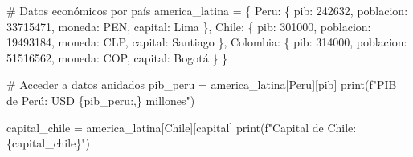 \documentclass[
  doc,
  floatsintext,
  longtable,
  a4paper,
  nolmodern,
  notxfonts,
  notimes,
  12pt,
  colorlinks=true,linkcolor=blue,citecolor=blue,urlcolor=blue]{apa7}
\newenvironment{Shaded}{\begin{snugshade}}{\end{snugshade}}
\newcommand{\BuiltInTok}[1]{\textcolor[rgb]{0.00,0.23,0.31}{#1}}
\newcommand{\CommentTok}[1]{\textcolor[rgb]{0.37,0.37,0.37}{#1}}
\newcommand{\DecValTok}[1]{\textcolor[rgb]{0.68,0.00,0.00}{#1}}
\newcommand{\NormalTok}[1]{\textcolor[rgb]{0.00,0.23,0.31}{#1}}
\newcommand{\OperatorTok}[1]{\textcolor[rgb]{0.37,0.37,0.37}{#1}}
\newcommand{\SpecialCharTok}[1]{\textcolor[rgb]{0.37,0.37,0.37}{#1}}
\newcommand{\SpecialStringTok}[1]{\textcolor[rgb]{0.13,0.47,0.30}{#1}}
\newcommand{\StringTok}[1]{\textcolor[rgb]{0.13,0.47,0.30}{#1}}
\begin{document}
\begin{Shaded}
\begin{Highlighting}[]
\CommentTok{\# Datos económicos por país}
\NormalTok{america\_latina }\OperatorTok{=}\NormalTok{ \{}
    \StringTok{\textquotesingle{}Peru\textquotesingle{}}\NormalTok{: \{}
        \StringTok{\textquotesingle{}pib\textquotesingle{}}\NormalTok{: }\DecValTok{242632}\NormalTok{,}
        \StringTok{\textquotesingle{}poblacion\textquotesingle{}}\NormalTok{: }\DecValTok{33715471}\NormalTok{,}
        \StringTok{\textquotesingle{}moneda\textquotesingle{}}\NormalTok{: }\StringTok{\textquotesingle{}PEN\textquotesingle{}}\NormalTok{,}
        \StringTok{\textquotesingle{}capital\textquotesingle{}}\NormalTok{: }\StringTok{\textquotesingle{}Lima\textquotesingle{}}
\NormalTok{    \},}
    \StringTok{\textquotesingle{}Chile\textquotesingle{}}\NormalTok{: \{}
        \StringTok{\textquotesingle{}pib\textquotesingle{}}\NormalTok{: }\DecValTok{301000}\NormalTok{,}
        \StringTok{\textquotesingle{}poblacion\textquotesingle{}}\NormalTok{: }\DecValTok{19493184}\NormalTok{,}
        \StringTok{\textquotesingle{}moneda\textquotesingle{}}\NormalTok{: }\StringTok{\textquotesingle{}CLP\textquotesingle{}}\NormalTok{,}
        \StringTok{\textquotesingle{}capital\textquotesingle{}}\NormalTok{: }\StringTok{\textquotesingle{}Santiago\textquotesingle{}}
\NormalTok{    \},}
    \StringTok{\textquotesingle{}Colombia\textquotesingle{}}\NormalTok{: \{}
        \StringTok{\textquotesingle{}pib\textquotesingle{}}\NormalTok{: }\DecValTok{314000}\NormalTok{,}
        \StringTok{\textquotesingle{}poblacion\textquotesingle{}}\NormalTok{: }\DecValTok{51516562}\NormalTok{,}
        \StringTok{\textquotesingle{}moneda\textquotesingle{}}\NormalTok{: }\StringTok{\textquotesingle{}COP\textquotesingle{}}\NormalTok{,}
        \StringTok{\textquotesingle{}capital\textquotesingle{}}\NormalTok{: }\StringTok{\textquotesingle{}Bogotá\textquotesingle{}}
\NormalTok{    \}}
\NormalTok{\}}

\CommentTok{\# Acceder a datos anidados}
\NormalTok{pib\_peru }\OperatorTok{=}\NormalTok{ america\_latina[}\StringTok{\textquotesingle{}Peru\textquotesingle{}}\NormalTok{][}\StringTok{\textquotesingle{}pib\textquotesingle{}}\NormalTok{]}
\BuiltInTok{print}\NormalTok{(}\SpecialStringTok{f"PIB de Perú: USD }\SpecialCharTok{\{}\NormalTok{pib\_peru}\SpecialCharTok{:,\}}\SpecialStringTok{ millones"}\NormalTok{)}

\NormalTok{capital\_chile }\OperatorTok{=}\NormalTok{ america\_latina[}\StringTok{\textquotesingle{}Chile\textquotesingle{}}\NormalTok{][}\StringTok{\textquotesingle{}capital\textquotesingle{}}\NormalTok{]}
\BuiltInTok{print}\NormalTok{(}\SpecialStringTok{f"Capital de Chile: }\SpecialCharTok{\{}\NormalTok{capital\_chile}\SpecialCharTok{\}}\SpecialStringTok{"}\NormalTok{)}


\end{Highlighting}
\end{Shaded}
\end{document}

